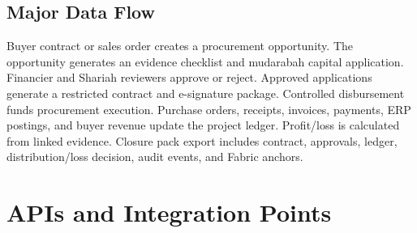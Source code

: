 \documentclass[11pt,a4paper]{article}
\begin{document}
\subsection{Major Data Flow}
Buyer contract or sales order creates a procurement opportunity. The opportunity generates an evidence checklist and mudarabah capital application. Financier and Shariah reviewers approve or reject. Approved applications generate a restricted contract and e-signature package. Controlled disbursement funds procurement execution. Purchase orders, receipts, invoices, payments, ERP postings, and buyer revenue update the project ledger. Profit/loss is calculated from linked evidence. Closure pack export includes contract, approvals, ledger, distribution/loss decision, audit events, and Fabric anchors.

\section{APIs and Integration Points}
\end{document}
